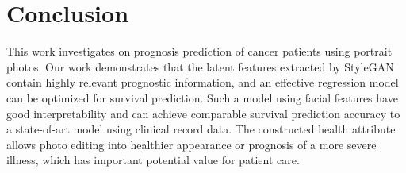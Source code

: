 \documentclass[runningheads]{llncs}
\begin{document}
\section{Conclusion}
This work investigates on prognosis prediction of cancer patients using portrait photos. Our work demonstrates that the latent features extracted by StyleGAN contain highly relevant prognostic information, and an effective regression model can be optimized for survival prediction. Such a model using facial features have good interpretability and can achieve comparable survival prediction accuracy to a state-of-art model using clinical record data. The constructed health attribute allows photo editing into healthier appearance or prognosis of a more severe illness, which has important potential value for patient care. %
\end{document}
